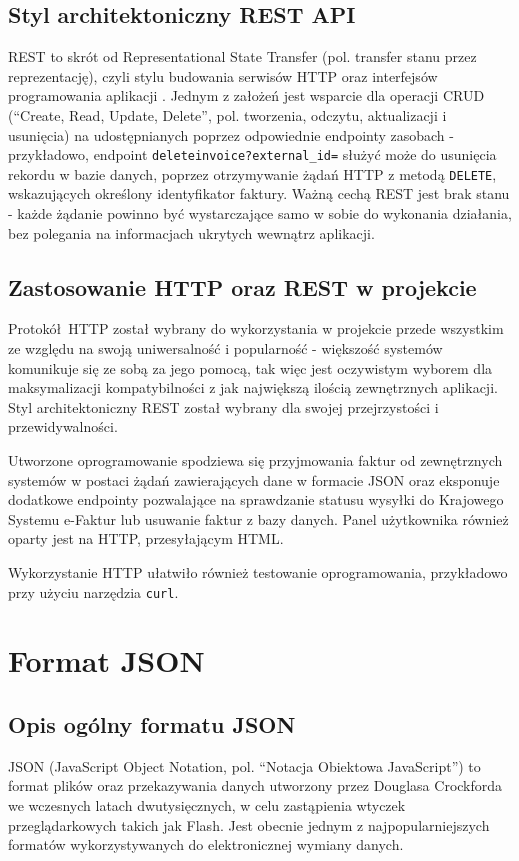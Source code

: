 \subsection{Styl architektoniczny REST API}
REST to skrót od Representational State Transfer (pol. transfer stanu przez reprezentację), czyli stylu budowania serwisów HTTP oraz interfejsów programowania aplikacji \parencite{fielding_rest}. Jednym z założeń jest wsparcie dla operacji CRUD (\enquote{Create, Read, Update, Delete}, pol. tworzenia, odczytu, aktualizacji i usunięcia) na udostępnianych poprzez odpowiednie endpointy zasobach - przykładowo, endpoint \texttt{\/deleteinvoice?external\_id=} służyć może do usunięcia rekordu w bazie danych, poprzez otrzymywanie żądań HTTP z metodą \texttt{DELETE}, wskazujących określony identyfikator faktury. Ważną cechą REST jest brak stanu - każde żądanie powinno być wystarczające samo w sobie do wykonania działania, bez polegania na informacjach ukrytych wewnątrz aplikacji.

\subsection{Zastosowanie HTTP oraz REST w projekcie}
Protokół HTTP został wybrany do wykorzystania w projekcie przede wszystkim ze względu na swoją uniwersalność i popularność - większość systemów komunikuje się ze sobą za jego pomocą, tak więc jest oczywistym wyborem dla maksymalizacji kompatybilności z jak największą ilością zewnętrznych aplikacji. Styl architektoniczny REST został wybrany dla swojej przejrzystości i przewidywalności.

Utworzone oprogramowanie spodziewa się przyjmowania faktur od zewnętrznych systemów w postaci żądań zawierających dane w formacie JSON oraz eksponuje dodatkowe endpointy pozwalające na sprawdzanie statusu wysyłki do Krajowego Systemu e-Faktur lub usuwanie faktur z bazy danych. Panel użytkownika również oparty jest na HTTP, przesyłającym HTML.

Wykorzystanie HTTP ułatwiło również testowanie oprogramowania, przykładowo przy użyciu narzędzia \texttt{curl}.

\section{Format JSON}
\subsection{Opis ogólny formatu JSON}
JSON (JavaScript Object Notation, pol. \enquote{Notacja Obiektowa JavaScript}) to format plików oraz przekazywania danych utworzony przez Douglasa Crockforda we wczesnych latach dwutysięcznych, w celu zastąpienia wtyczek przeglądarkowych takich jak Flash. Jest obecnie jednym z najpopularniejszych formatów wykorzystywanych do elektronicznej wymiany danych.

